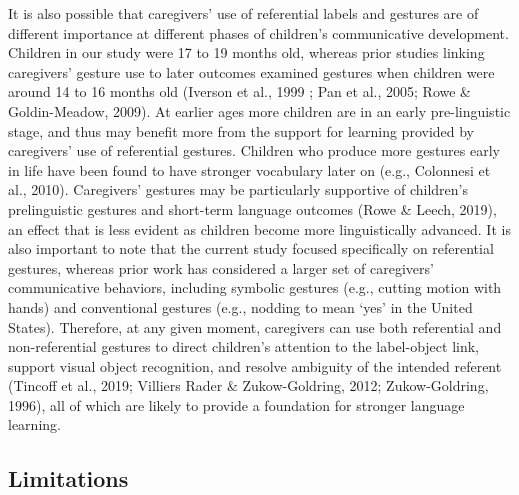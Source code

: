 \documentclass[
  man,mask,floatsintext]{apa6}
\begin{document}
It is also possible that caregivers' use of referential labels and gestures are of different importance at different phases of children's communicative development. Children in our study were 17 to 19 months old, whereas prior studies linking caregivers' gesture use to later outcomes examined gestures when children were around 14 to 16 months old (Iverson et al., 1999 ; Pan et al., 2005; Rowe \& Goldin-Meadow, 2009). At earlier ages more children are in an early pre-linguistic stage, and thus may benefit more from the support for learning provided by caregivers' use of referential gestures. Children who produce more gestures early in life have been found to have stronger vocabulary later on (e.g., Colonnesi et al., 2010). Caregivers' gestures may be particularly supportive of children's prelinguistic gestures and short-term language outcomes (Rowe \& Leech, 2019), an effect that is less evident as children become more linguistically advanced. It is also important to note that the current study focused specifically on referential gestures, whereas prior work has considered a larger set of caregivers' communicative behaviors, including symbolic gestures (e.g., cutting motion with hands) and conventional gestures (e.g., nodding to mean `yes' in the United States). Therefore, at any given moment, caregivers can use both referential and non-referential gestures to direct children's attention to the label-object link, support visual object recognition, and resolve ambiguity of the intended referent (Tincoff et al., 2019; Villiers Rader \& Zukow-Goldring, 2012; Zukow-Goldring, 1996), all of which are likely to provide a foundation for stronger language learning.

\hypertarget{limitations}{%
\subsection{Limitations}\label{limitations}}
\end{document}
